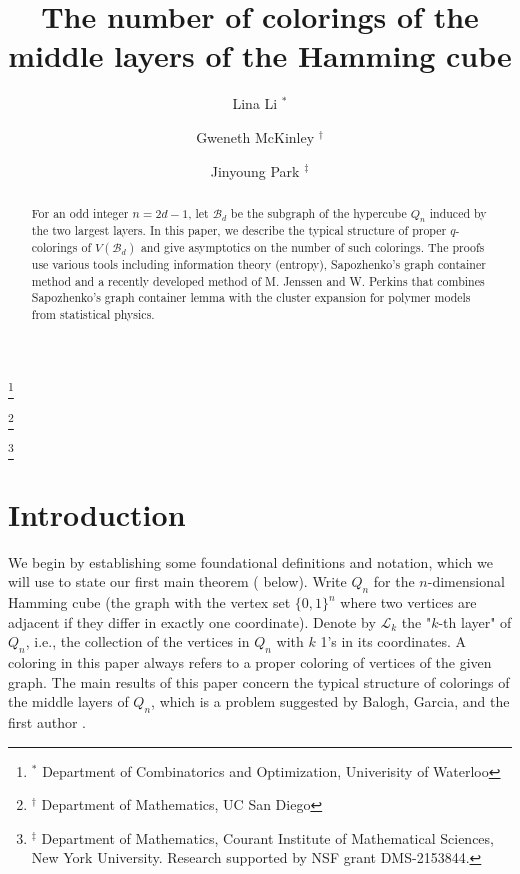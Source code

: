 \documentclass{amsart}
\theoremstyle{definition}
\newcommand{\cL}{\mathcal{L} }
\newcommand{\0}[0]{\emptyset}
\begin{document}
\title{The number of colorings of the middle layers of the Hamming cube}

\author{Lina Li $^*$}
\thanks{$^*$  Department of Combinatorics and Optimization, Univerisity of Waterloo}

\author{Gweneth McKinley $^\dagger$}
\thanks{$^\dagger$ Department of Mathematics, UC San Diego}

\author{Jinyoung Park $^\ddagger$}
\thanks{$^\ddagger$ Department of Mathematics, Courant Institute of Mathematical Sciences, New York University. Research supported by NSF grant DMS-2153844.}


\begin{abstract}
For an odd integer $n = 2d-1$, let $\mathcal B_d$ be the subgraph of the hypercube $Q_n$ induced by the two largest layers. In this paper, we describe the typical structure of proper $q$-colorings of $V(\mathcal B_d)$ and give asymptotics on the number of such colorings. 
The proofs use various tools including information theory (entropy), Sapozhenko's graph container method and a recently developed method of M. Jenssen and W. Perkins that combines Sapozhenko's graph container lemma with the cluster expansion for polymer models from
statistical physics.
\end{abstract}

\maketitle


\section{Introduction}\label{sec.intro}
We begin by establishing some foundational definitions and notation, which we will use to state our first main theorem ( below). Write $Q_n$ for the $n$-dimensional Hamming cube (the graph with the vertex set $\{0, 1\}^ n$ where two vertices are adjacent if they differ in exactly one coordinate).
Denote by $\cL_k$ the "$k$-th layer" of $Q_n$, i.e., the collection of the vertices in $Q_n$ with $k$ 1's in its coordinates. A coloring in this paper always refers to a proper coloring of vertices of the given graph. 
The main results of this paper concern the typical structure of colorings of the middle layers of $Q_n$, which is a problem suggested by Balogh, Garcia, and the first author \cite{BGL}. 
\end{document}
